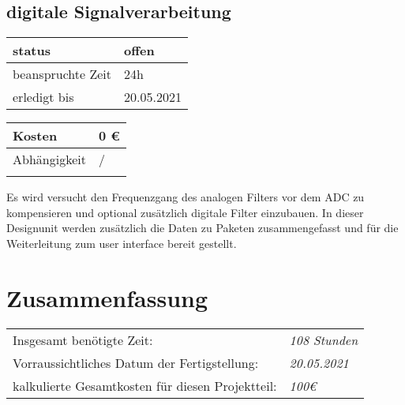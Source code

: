 \documentclass{scrartcl}
\begin{document}
\subsection{digitale Signalverarbeitung}
\begin{tabular}[h]{|l|l|} %
	\hline
	status & offen\\
	\hline
	beanspruchte Zeit & 24h \\
	\hline
	erledigt bis & 20.05.2021 \\
	\hline
\end{tabular}
\begin{tabular}[h]{|l|l|} %
	\hline
	Kosten & 0 €\\
	\hline
	Abhängigkeit & /\\
	\hline
	 &  \\
	\hline
\end{tabular}
Es wird versucht den Frequenzgang des analogen Filters vor dem ADC zu kompensieren und optional zusätzlich digitale Filter einzubauen. In dieser Designunit werden zusätzlich die Daten zu Paketen zusammengefasst und für die Weiterleitung zum user interface bereit gestellt.
\section{Zusammenfassung}
\begin{tabular}{ll}
	Insgesamt benötigte Zeit: &\textit{108 Stunden}\\
	Vorraussichtliches Datum der Fertigstellung: &\textit{20.05.2021}\\
	kalkulierte Gesamtkosten für diesen Projektteil: &\textit{100€}
\end{tabular}
\end{document}
